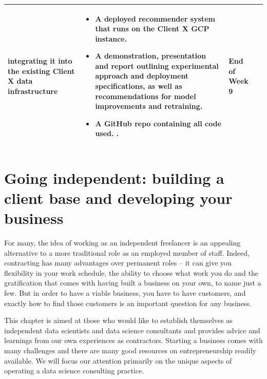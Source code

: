\documentclass[]{book}
\providecommand{\tightlist}{%
  \setlength{\itemsep}{0pt}\setlength{\parskip}{0pt}}
\begin{document}
\begin{smaller}
\begin{longtable}[]{@{}llll@{}}
\begin{minipage}[t]{0.30\columnwidth}
\begin{itemize}
  integrating it into the existing Client X data infrastructure
\end{itemize}\strut
\end{minipage} & \begin{minipage}[t]{0.30\columnwidth}\raggedright
\begin{itemize}
\tightlist
\item
  A deployed recommender system that runs on the Client X GCP instance.
\item
  A demonstration, presentation and report outlining experimental
  approach and deployment specifications, as well as recommendations for
  model improvements and retraining.
\item
  A GitHub repo containing all code used. .
\end{itemize}\strut
\end{minipage} & \begin{minipage}[t]{0.15\columnwidth}\raggedright
End of Week 9\strut
\end{minipage}\tabularnewline
\bottomrule
\end{longtable}

\end{smaller}

\hypertarget{consulting}{%
\chapter{Going independent: building a client base and developing your
business}\label{consulting}}

For many, the idea of working as an independent freelancer is an
appealing alternative to a more traditional role as an employed member
of staff. Indeed, contracting has many advantages over permanent roles
-- it can give you flexibility in your work schedule, the ability to
choose what work you do and the gratification that comes with having
built a business on your own, to name just a few. But in order to have a
viable business, you have to have customers, and exactly how to find
those customers is an important question for any business.

This chapter is aimed at those who would like to establish themselves as
independent data scientists and data science consultants and provides
advice and learnings from our own experiences as contractors. Starting a
business comes with many challenges and there are many good resources on
entrepreneurship readily available. We will focus our attention
primarily on the unique aspects of operating a data science consulting
practice.
\end{document}
